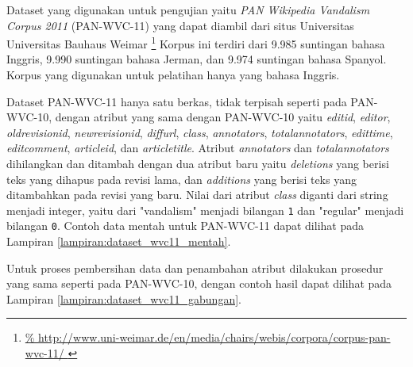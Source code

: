 Dataset yang digunakan untuk pengujian yaitu \textit{PAN Wikipedia Vandalism
Corpus 2011} (PAN-WVC-11)
\parencite{potthast:2010b}
yang dapat diambil dari situs Universitas Universitas Bauhaus Weimar
\footnote{%
	\RaggedRight\url{%
http://www.uni-weimar.de/en/media/chairs/webis/corpora/corpus-pan-wvc-11/
	}
}
Korpus ini terdiri dari 9.985 suntingan bahasa Inggris, 9.990 suntingan bahasa
Jerman, dan 9.974 suntingan bahasa Spanyol.
Korpus yang digunakan untuk pelatihan hanya yang bahasa Inggris.

Dataset PAN-WVC-11 hanya satu berkas, tidak terpisah seperti pada PAN-WVC-10,
dengan atribut yang sama dengan PAN-WVC-10 yaitu
\textit{editid},
\textit{editor},
\textit{oldrevisionid},
\textit{newrevisionid},
\textit{diffurl},
\textit{class},
\textit{annotators},
\textit{totalannotators},
\textit{edittime},
\textit{editcomment},
\textit{articleid}, dan
\textit{articletitle}.
Atribut \textit{annotators} dan \textit{totalannotators} dihilangkan dan
ditambah dengan dua atribut baru yaitu \textit{deletions} yang berisi teks yang
dihapus pada revisi lama, dan \textit{additions} yang berisi teks yang
ditambahkan pada revisi yang baru.
Nilai dari atribut \textit{class} diganti dari string menjadi integer, yaitu
dari "vandalism" menjadi bilangan \texttt{1}
dan "regular" menjadi bilangan \texttt{0}.
Contoh data mentah untuk PAN-WVC-11 dapat dilihat pada Lampiran
\ref{lampiran:dataset_wvc11_mentah}.

Untuk proses pembersihan data dan penambahan atribut dilakukan prosedur yang
sama seperti pada PAN-WVC-10, dengan contoh hasil dapat dilihat pada Lampiran
\ref{lampiran:dataset_wvc11_gabungan}.
